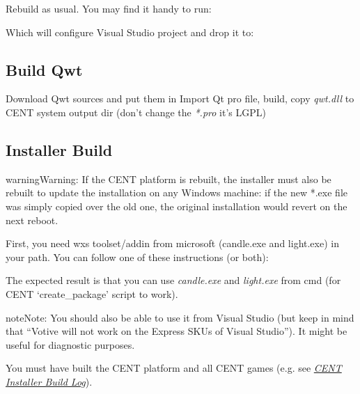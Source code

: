 \documentclass[letterpaper,10pt,english]{sphinxmanual}
\begin{document}
Rebuild as usual. You may find it handy to run:
\begin{quote}

\end{quote}

Which will configure Visual Studio project and drop it to:
\begin{quote}

\end{quote}


\subsection{Build Qwt}
\label{index:build-qwt}
Download Qwt sources and put them in 
Import Qt pro file, build, copy \emph{qwt.dll} to CENT system output dir (don't change the \emph{*.pro} it's LGPL)


\subsection{\textbf{Installer Build}}
\label{index:installer-build}\label{index:id7}
\begin{notice}{warning}{Warning:}
If the CENT platform is rebuilt, the installer must also be rebuilt to update the installation on any Windows machine: if the new *.exe file was simply copied over the old one, the original installation would revert on the next reboot.
\end{notice}

First, you need wxs toolset/addin from microsoft (candle.exe and light.exe) in your path.
You can follow one of these instructions (or both):

The expected result is that you can use \emph{candle.exe} and \emph{light.exe} from cmd (for CENT `create\_package' script to work).

\begin{notice}{note}{Note:}
You should also be able to use it from Visual Studio (but keep in mind that ``Votive will not work on the Express SKUs of Visual Studio''). It might be useful for diagnostic purposes.
\end{notice}

You must have built the CENT platform and all CENT games (e.g. see {\hyperref[index:inst-build-log]{\emph{CENT Installer Build Log}}}).
\end{document}
